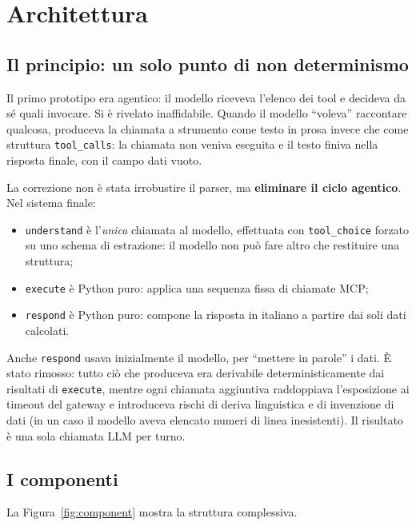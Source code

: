 \documentclass[a4paper,oneside]{Tptesi2}
\begin{document}
\chapter{Architettura}
\label{cap:architettura}

\section{Il principio: un solo punto di non determinismo}

Il primo prototipo era agentico: il modello riceveva l'elenco dei tool e decideva da
s\'e quali invocare. Si \`e rivelato inaffidabile. Quando il modello ``voleva''
raccontare qualcosa, produceva la chiamata a strumento come testo in prosa invece che
come struttura \texttt{tool\_calls}: la chiamata non veniva eseguita e il testo finiva
nella risposta finale, con il campo dati vuoto.

La correzione non \`e stata irrobustire il parser, ma \textbf{eliminare il ciclo
agentico}. Nel sistema finale:

\begin{itemize}
  \item \texttt{understand} \`e l'\emph{unica} chiamata al modello, effettuata con
        \texttt{tool\_choice} forzato su uno schema di estrazione: il modello non pu\`o
        fare altro che restituire una struttura;
  \item \texttt{execute} \`e Python puro: applica una sequenza fissa di chiamate MCP;
  \item \texttt{respond} \`e Python puro: compone la risposta in italiano a partire dai
        soli dati calcolati.
\end{itemize}

Anche \texttt{respond} usava inizialmente il modello, per ``mettere in parole'' i dati.
\`E stato rimosso: tutto ci\`o che produceva era derivabile deterministicamente dai
risultati di \texttt{execute}, mentre ogni chiamata aggiuntiva raddoppiava
l'esposizione ai timeout del gateway e introduceva rischi di deriva linguistica e di
invenzione di dati (in un caso il modello aveva elencato numeri di linea inesistenti).
Il risultato \`e una sola chiamata LLM per turno.

\section{I componenti}

La Figura~\ref{fig:component} mostra la struttura complessiva.
\end{document}
